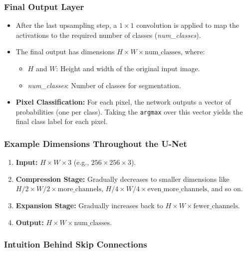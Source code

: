 \documentclass[letterpaper,12pt,notitlepage,twoside]{report}
\begin{document}
\subsubsection*{Final Output Layer}

\begin{itemize}
    \item After the last upsampling step, a \( 1 \times 1 \) convolution is applied to map the activations to the required number of classes (\textit{num\_classes}).
    \item The final output has dimensions \( H \times W \times \text{num\_classes} \), where:
    \begin{itemize}
        \item \( H \) and \( W \): Height and width of the original input image.
        \item \textit{num\_classes}: Number of classes for segmentation.
    \end{itemize}
    \item \textbf{Pixel Classification:} For each pixel, the network outputs a vector of probabilities (one per class). Taking the \texttt{argmax} over this vector yields the final class label for each pixel.
\end{itemize}

\subsubsection*{Example Dimensions Throughout the U-Net}

\begin{enumerate}
    \item \textbf{Input:} \( H \times W \times 3 \) (e.g., \( 256 \times 256 \times 3 \)).
    \item \textbf{Compression Stage:} Gradually decreases to smaller dimensions like \( H/2 \times W/2 \times \text{more\_channels} \), \( H/4 \times W/4 \times \text{even\_more\_channels} \), and so on.
    \item \textbf{Expansion Stage:} Gradually increases back to \( H \times W \times \text{fewer\_channels} \).
    \item \textbf{Output:} \( H \times W \times \text{num\_classes} \).
\end{enumerate}

\subsubsection*{Intuition Behind Skip Connections}
\end{document}

